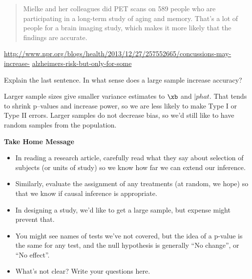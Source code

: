 \begin{enumerate}
{\begin{quotation}
Mielke and her colleagues did PET scans on 589 people who are
participating in a long-term study of aging and memory. That's a lot
of people for a brain imaging study, which makes it more likely that
the findings are accurate. 
  \end{quotation}
}
\url{http://www.npr.org/blogs/health/2013/12/27/257552665/concussions-may-increase-}
\url{alzheimers-risk-but-only-for-some}

Explain the last sentence.  In what sense does a large sample increase accuracy?

\begin{students}
 \vspace{4cm}
\end{students}

\begin{key}
   Larger sample sizes give smaller variance estimates to $\xb$ and
   $|phat$.  That tends to shrink p--values and increase power, so we
   are less likely to make Type I or Type II errors. Larger samples do
   not decrease bias, so we'd still like to have random samples from
   the population.
\end{key}


\end{enumerate}


\begin{center}
  {\large\bf Take Home Message}
\end{center}

\begin{itemize}
\item  In reading a research article, carefully read what they say
  about selection of subjects (or units of study) so we know how far
  we can extend our inference.
\item Similarly, evaluate the assignment of any treatments (at random,
  we hope) so that we know if causal inference is appropriate.
\item In designing a study, we'd like to get a large sample, but
  expense might prevent that.
\item You might see names of tests we've not covered, but the idea of
  a p-value is the same for any test, and the null hypothesis is
  generally ``No change'', or ``No effect''.
\item What's not clear?  Write your questions here.
\end{itemize}


